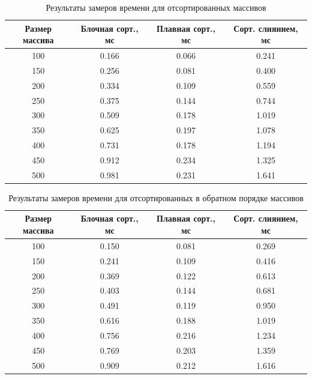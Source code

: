 \begin{table}[H]
	\begin{center}
		\begin{threeparttable}
			\captionsetup{justification=raggedright, singlelinecheck=off}
			\caption{Результаты замеров времени для отсортированных массивов}
			\label{tbl:time_mes_sort}
			\begin{tabular}{|c|c|c|c|}
				\hline
				Размер массива & Блочная сорт., мс & Плавная сорт., мс & Сорт. слиянием, мс\\
				\hline
				100&0.166&0.066&0.241\\
				\hline
				150&0.256&0.081&0.400\\
				\hline
				200&0.334&0.109&0.559\\
				\hline
				250&0.375&0.144&0.744\\
				\hline
				300&0.509&0.178&1.019\\
				\hline
				350&0.625&0.197&1.078\\
				\hline
				400&0.731&0.178&1.194\\
				\hline
				450&0.912&0.234&1.325\\
				\hline
				500&0.981&0.231&1.641\\
				\hline
			\end{tabular}
		\end{threeparttable}
	\end{center}
\end{table}

\begin{table}[H]
	\begin{center}
		\begin{threeparttable}
			\captionsetup{justification=raggedright, singlelinecheck=off}
			\caption{Результаты замеров времени для отсортированных в обратном порядке массивов}
			\label{tbl:time_mes_rev}
			\begin{tabular}{|c|c|c|c|}
				\hline
				Размер массива & Блочная сорт., мс & Плавная сорт., мс & Сорт. слиянием, мс\\
				\hline
				100&0.150&0.081&0.269\\
				\hline
				150&0.241&0.109&0.416\\
				\hline
				200&0.369&0.122&0.613\\
				\hline
				250&0.403&0.144&0.681\\
				\hline
				300&0.491&0.119&0.950\\
				\hline
				350&0.616&0.188&1.019\\
				\hline
				400&0.756&0.216&1.234\\
				\hline
				450&0.769&0.203&1.359\\
				\hline
				500&0.909&0.212&1.616\\
				\hline
			\end{tabular}
		\end{threeparttable}
	\end{center}
\end{table}



